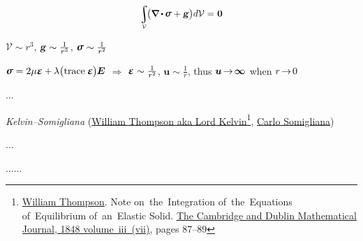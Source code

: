\nopagebreak\vspace{-0.2em}\begin{equation*}
\scalebox{.81}{$ \displaystyle\integral\displaylimits_{\mathcal{V}} $} \hspace{-0.4ex}
\scalebox{.95}{$ \bigl( \boldnabla \hspace{-0.1ex} \dotp \hspace{-0.1ex} \linearstress
    + \volumeloadvector \bigr) d\mathcal{V}
    = \hspace{.1ex} \zerovector $}
\end{equation*}

\nopagebreak\vspace{-1em}\noindent
\hfill
${\mathcal{V} \sim r^3}$, ${\textbf{\textsl{g}} \sim \frac{1}{r^3}}$, ${\linearstress \sim \frac{1}{r^2}}$

\noindent
\hfill
${\linearstress
= 2 \thesecondlameparameter \infinitesimaldeformation
\hspace{-0.1ex} + \hspace{-0.1ex} \thefirstlameparameter \bigl( \trace{\infinitesimaldeformation} \hspace{-0.1ex} \bigr) \hspace{-0.1ex} \UnitDyad }$
$\Rightarrow$
${\infinitesimaldeformation \sim \frac{1}{r^2}}$, ${\bm{u} \sim \frac{1}{r}}$,
thus ${\bm{u} \hspace{-0.33ex}\to\hspace{-0.33ex} \bm{\infty}}$ when ${r \hspace{-0.33ex}\to\hspace{-0.33ex} 0}$

...

\noindent
\emph{ Kelvin\hbox{--}Somigliana}
(\href{https://en.wikipedia.org/wiki/Lord_Kelvin}{William Thompson aka Lord Kelvin}\footnote{%
\href{https://en.wikipedia.org/wiki/Lord_Kelvin}{William  Thompson}.
Note on~the~Integration of~the~Equations of~Equilibrium of~an~Elastic Solid.
\href{https://ia904507.us.archive.org/25/items/sim_cambridge-and-dublin-mathematical-journal_1848_7/sim_cambridge-and-dublin-mathematical-journal_1848_7.pdf}{The Cambridge and Dublin Mathematical Journal, 1848 volume~iii~(vii)},
pages 87\hbox{--}89
}\hbox{\hspace{-0.55ex},}
\href{https://en.wikipedia.org/wiki/Carlo_Somigliana}{Carlo Somigliana})

... ~

......


